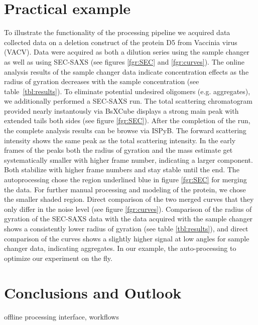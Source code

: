 \documentclass[preprint,pdf]{iucr}              %
\begin{document}
\section{Practical example}
To illustrate the functionality of the processing pipeline we acquired data collected 
data on a deletion construct  of the protein D5 from  Vaccinia virus (VACV). 
Data were acquired as both a dilution series using the sample changer as well as 
using SEC-SAXS (see figures \ref{fgr:SEC} and \ref{fgr:curves}). 
The online analysis results of the sample changer data indicate concentration effects 
as the radius of gyration decreases with the  sample concentration (see table~\ref{tbl:results}). 
To eliminate potential undesired oligomers (e.g. aggregates), we additionally performed a SEC-SAXS run.  
The total scattering chromatogram provided nearly instantously via BsXCube displays a strong main 
peak with extended tails both sides (see figure \ref{fgr:SEC}). 
After the completion of the run, the complete analysis results can be browse via ISPyB. 
The forward scattering intensity shows the same peak as the total scattering intensity. 
In the early frames of the peaks both the radius of gyration and the mass estimate get systematically 
smaller with higher frame number, indicating a larger component.
Both stabilize with higher frame numbers and stay stable until the end.  
The autoprocessing chose the region underlined blue in figure  \ref{fgr:SEC} for merging the data. 
For further manual processing and modeling of the protein, we chose the smaller shaded region.  
Direct comparison of the two merged curves that they only differ in the noise level 
(see figure \ref{fgr:curves}). 
Comparison of the radius of gyration of the SEC-SAXS data with the data acquired with the sample 
changer shows a consistently lower radius of gyration (see table \ref{tbl:results}), and direct 
comparison of the curves shows a slightly higher signal at low angles for sample changer data, 
indicating aggregates.
In our example, the auto-processing to optimize our experiment on the fly.

\section{Conclusions and Outlook}
offline processing interface, workflows

\appendix
{}
\end{document}
